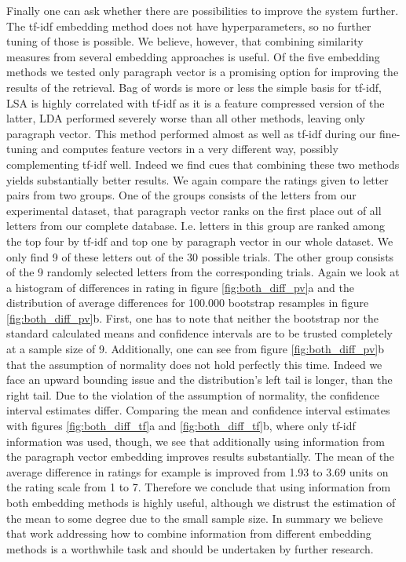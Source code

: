 Finally one can ask whether there are possibilities to improve the system further. The tf-idf embedding method does not have hyperparameters, so no further tuning of those is possible. We believe, however, that combining similarity measures from several embedding approaches is useful. Of the five embedding methods we tested only paragraph vector is a promising option for improving the results of the retrieval. Bag of words is more or less the simple basis for tf-idf, LSA is highly correlated with tf-idf as it is a feature compressed version of the latter, LDA performed severely worse than all other methods, leaving only paragraph vector. This method performed almost as well as tf-idf during our fine-tuning and computes feature vectors in a very different way, possibly complementing tf-idf well. Indeed we find cues that combining these two methods yields substantially better results. We again compare the ratings given to letter pairs from two groups. One of the groups consists of the letters from our experimental dataset, that paragraph vector ranks on the first place out of all letters from our complete database. I.e. letters in this group are ranked among the top four by tf-idf and top one by paragraph vector in our whole dataset. We only find 9 of these letters out of the 30 possible trials. The other group consists of the 9 randomly selected letters from the corresponding trials. Again we look at a histogram of differences in rating in figure \ref{fig:both_diff_pv}a and the distribution of average differences for 100.000 bootstrap resamples in figure \ref{fig:both_diff_pv}b. First, one has to note that neither the bootstrap nor the standard calculated means and confidence intervals are to be trusted completely at a sample size of 9. Additionally, one can see from figure \ref{fig:both_diff_pv}b that the assumption of normality does not hold perfectly this time. Indeed we face an upward bounding issue and the distribution's left tail is longer, than the right tail. Due to the violation of the assumption of normality, the confidence interval estimates differ. Comparing the mean and confidence interval estimates with figures \ref{fig:both_diff_tf}a and \ref{fig:both_diff_tf}b, where only tf-idf information was used, though, we see that additionally using information from the paragraph vector embedding improves results substantially. The mean of the average difference in ratings for example is improved from 1.93 to 3.69 units on the rating scale from 1 to 7. Therefore we conclude that using information from both embedding methods is highly useful, although we distrust the estimation of the mean to some degree due to the small sample size. In summary we believe that work addressing how to combine information from different embedding methods is a worthwhile task and should be undertaken by further research.
